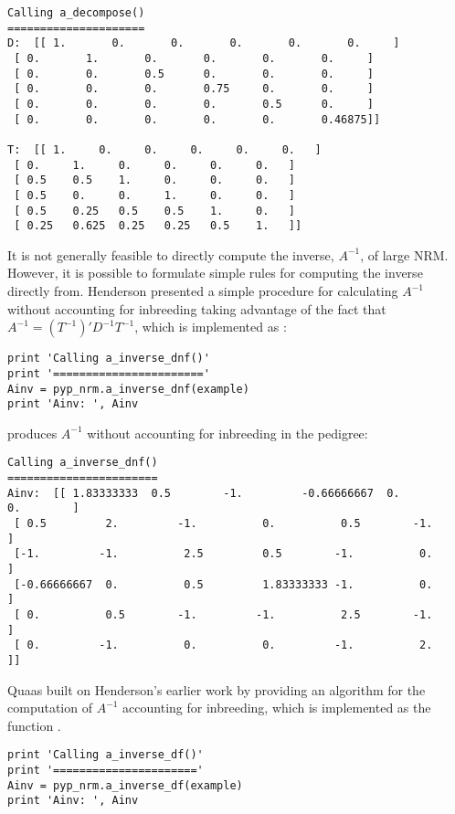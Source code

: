 \begin{verbatim}
Calling a_decompose()
=====================
D:  [[ 1.       0.       0.       0.       0.       0.     ]
 [ 0.       1.       0.       0.       0.       0.     ]
 [ 0.       0.       0.5      0.       0.       0.     ]
 [ 0.       0.       0.       0.75     0.       0.     ]
 [ 0.       0.       0.       0.       0.5      0.     ]
 [ 0.       0.       0.       0.       0.       0.46875]]

T:  [[ 1.     0.     0.     0.     0.     0.   ]
 [ 0.     1.     0.     0.     0.     0.   ]
 [ 0.5    0.5    1.     0.     0.     0.   ]
 [ 0.5    0.     0.     1.     0.     0.   ]
 [ 0.5    0.25   0.5    0.5    1.     0.   ]
 [ 0.25   0.625  0.25   0.25   0.5    1.   ]]
\end{verbatim}
It is not generally feasible to directly compute the inverse, $A^{-1}$, of large NRM. However, it is possible to formulate simple rules for computing the inverse directly from. Henderson \citeyear{ref143} presented a simple procedure for calculating $A^{-1}$ without accounting for inbreeding taking advantage of the fact that $A^{-1}=(T^{-1})'D^{-1}T^{-1}$, which is implemented as :
\begin{verbatim}
print 'Calling a_inverse_dnf()'
print '======================='
Ainv = pyp_nrm.a_inverse_dnf(example)
print 'Ainv: ', Ainv
\end{verbatim}
produces $A^{-1}$ without accounting for inbreeding in the pedigree:
\begin{verbatim}
Calling a_inverse_dnf()
=======================
Ainv:  [[ 1.83333333  0.5        -1.         -0.66666667  0.          0.        ]
 [ 0.5         2.         -1.          0.          0.5        -1.        ]
 [-1.         -1.          2.5         0.5        -1.          0.        ]
 [-0.66666667  0.          0.5         1.83333333 -1.          0.        ]
 [ 0.          0.5        -1.         -1.          2.5        -1.        ]
 [ 0.         -1.          0.          0.         -1.          2.        ]]
\end{verbatim}
Quaas \citeyear{ref235} built on Henderson's earlier work by providing an algorithm for the computation of $A^{-1}$ accounting for inbreeding, which is implemented as the function  .
\begin{verbatim}
print 'Calling a_inverse_df()'
print '======================'
Ainv = pyp_nrm.a_inverse_df(example)
print 'Ainv: ', Ainv
\end{verbatim}
